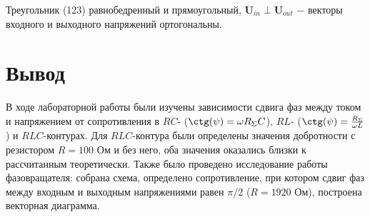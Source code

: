 \documentclass[a4paper,12pt]{article} %
\begin{document}
\hfill \break Треугольник (123) равнобедренный и прямоугольный, $\textbf{U}_{in} \perp \textbf{U}_{out}$ $-$ векторы входного и выходного напряжений ортогональны.

\section{Вывод}
\hfill \break В ходе лабораторной работы были изучены зависимости сдвига фаз между током и напряжением от сопротивления в $RC$- ($\ctg(\psi) = \omega R_{\Sigma} C$), $RL$- ($\ctg(\psi) = \frac{R_{\Sigma}}{\omega L}$) и $RLC$-контурах. Для $RLC$-контура были определены значения добротности с резистором $R = 100$ Ом и без него, оба значения оказались близки к рассчитанным теоретически. Также было проведено исследование работы фазовращателя: собрана схема, определено сопротивление, при котором сдвиг фаз между входным и выходным напряжениями равен $\pi/2$ ($R = 1920$ Ом), построена векторная диаграмма. 
\end{document}
